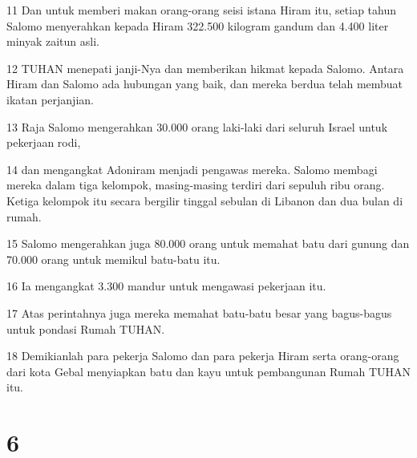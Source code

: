 \par 11 Dan untuk memberi makan orang-orang seisi istana Hiram itu, setiap tahun Salomo menyerahkan kepada Hiram 322.500 kilogram gandum dan 4.400 liter minyak zaitun asli.
\par 12 TUHAN menepati janji-Nya dan memberikan hikmat kepada Salomo. Antara Hiram dan Salomo ada hubungan yang baik, dan mereka berdua telah membuat ikatan perjanjian.
\par 13 Raja Salomo mengerahkan 30.000 orang laki-laki dari seluruh Israel untuk pekerjaan rodi,
\par 14 dan mengangkat Adoniram menjadi pengawas mereka. Salomo membagi mereka dalam tiga kelompok, masing-masing terdiri dari sepuluh ribu orang. Ketiga kelompok itu secara bergilir tinggal sebulan di Libanon dan dua bulan di rumah.
\par 15 Salomo mengerahkan juga 80.000 orang untuk memahat batu dari gunung dan 70.000 orang untuk memikul batu-batu itu.
\par 16 Ia mengangkat 3.300 mandur untuk mengawasi pekerjaan itu.
\par 17 Atas perintahnya juga mereka memahat batu-batu besar yang bagus-bagus untuk pondasi Rumah TUHAN.
\par 18 Demikianlah para pekerja Salomo dan para pekerja Hiram serta orang-orang dari kota Gebal menyiapkan batu dan kayu untuk pembangunan Rumah TUHAN itu.

\chapter{6}


